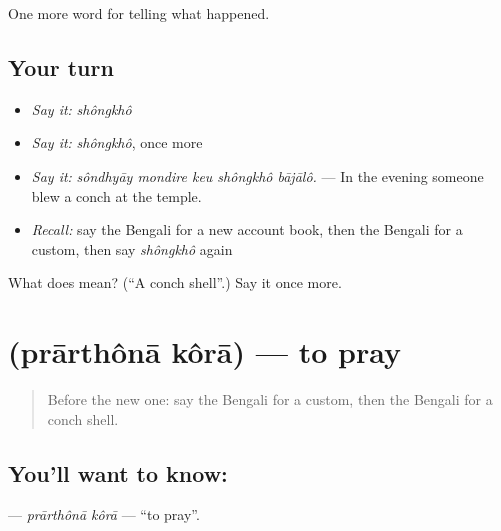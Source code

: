 \begin{grammarlens}[title={What you've built}]
One more word for telling what happened.
\end{grammarlens}

\subsection*{Your turn}
\begin{itemize}
\raggedright
  \item \emph{Say it:} \emph{shôngkhô}
  \item \emph{Say it:} \emph{shôngkhô}, once more
  \item \emph{Say it:} \emph{sôndhyāy mondire keu shôngkhô bājālô.} — In the evening someone blew a conch at the temple.
  \item \emph{Recall:} say the Bengali for a new account book, then the Bengali for a custom, then say \emph{shôngkhô} again
\end{itemize}

\begin{tcolorbox}[breakable,colback=teal!4,colframe=teal!35!black,title={Before you move on}]
What does  mean? (\textquotedblleft{}A conch shell\textquotedblright{}.) Say it once more.
\end{tcolorbox}
\section[\texorpdfstring{\bn{প্রার্থনা} \bn{করা} (prārthônā kôrā)}{প্রার্থনা করা (prārthônā kôrā)}]{  (prārthônā kôrā) — to pray}

\label{lesson:BN-C310-prarthona-kora}



\begin{quote}
Before the new one: say the Bengali for a custom, then the Bengali for a conch shell.
\end{quote}

\subsection*{You'll want to know:  }
\textbf{ } — \emph{prārthônā kôrā} — \textquotedblleft{}to pray\textquotedblright{}.

\begin{quote}
      
\end{quote}

